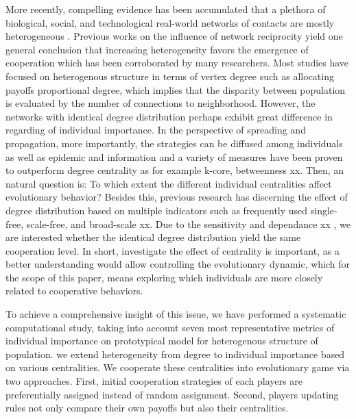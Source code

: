 \documentclass[preprint,12pt,3p]{elsarticle}
\begin{document}
    More recently, compelling evidence has been accumulated that a plethora of biological,
social, and technological real-world networks of contacts are mostly
heterogeneous \cite{AmaralScala-18284,DorogovtsevMendes-18285,AlbertBarabási-18286}.
Previous works on the influence of network reciprocity yield one general conclusion that
increasing heterogeneity favors the emergence of cooperation which has been corroborated
by many researchers\cite{SantosPacheco-18280}.
Most studies have focused on heterogenous structure in terms of vertex degree such as
allocating payoffs proportional degree\cite{SantosSantos-18293},
which implies that the disparity between population is evaluated by the number of connections to neighborhood.
However, the networks with identical degree distribution perhaps
exhibit great difference in regarding of individual importance.
In the perspective of spreading and propagation, more importantly, the strategies can be diffused among
individuals as well as epidemic and information and a variety of measures have been proven to outperform
degree centrality as for example k-core, betweenness xx.
Then, an natural question is: To which extent the different individual centralities affect evolutionary behavior?
    Besides this, previous research has discerning the effect of degree distribution based on multiple indicators
 such as frequently used single-free, scale-free, and broad-scale xx.
Due to the sensitivity and dependance xx , we are interested whether the identical degree distribution yield the same cooperation level.
    In short, investigate the effect of centrality is important,
as a better understanding would allow controlling the evolutionary dynamic,
which for the scope of this paper, means exploring which individuals are
more closely related to cooperative behaviors.

To achieve a comprehensive insight of this issue, we have performed a systematic computational
study, taking into account seven most representative metrics of individual importance on
prototypical model for heterogenous structure of population.
we extend heterogeneity from degree to individual importance based on various centralities.
We cooperate these centralities into evolutionary game via two approaches.
First, initial cooperation strategies of each players are preferentially assigned instead of random assignment.
Second, players updating rules not only compare their own payoffs but also their centralities.


\end{document}
